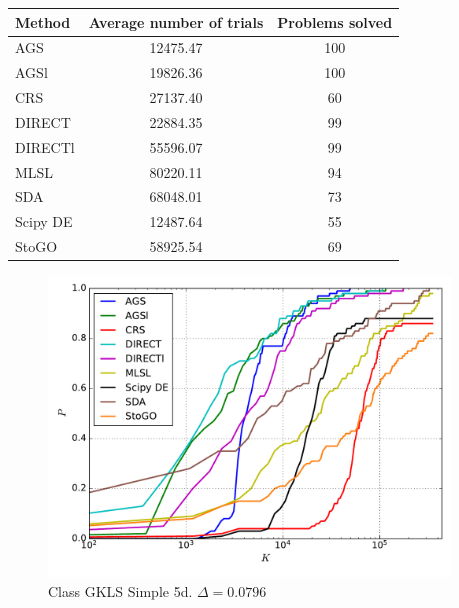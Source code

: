 \documentclass[a4paper]{article}
\begin{document}
\begin{tabular}{lcc}
\hline
 Method   &  Average number of trials  &  Problems solved  \\
\hline
 AGS      &          12475.47          &        100        \\
 AGSl     &          19826.36          &        100        \\
 CRS      &          27137.40          &        60         \\
 DIRECT   &          22884.35          &        99         \\
 DIRECTl  &          55596.07          &        99         \\
 MLSL     &          80220.11          &        94         \\
 SDA      &          68048.01          &        73         \\
 Scipy DE &          12487.64          &        55         \\
 StoGO    &          58925.54          &        69         \\
\hline
\end{tabular}
\begin{figure}[H]
  \center
  \includegraphics[width=0.95\textwidth]{../experiments/gklss5d_serg/cmc.pdf}
  \caption{Class GKLS Simple 5d. $\Delta=0.0796$}

\end{figure}
\end{document}

